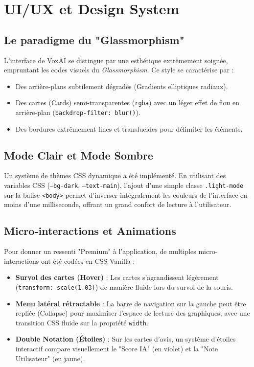 \documentclass[12pt,a4paper]{article}
\begin{document}
\section{UI/UX et Design System}
\subsection{Le paradigme du "Glassmorphism"}
L'interface de VoxAI se distingue par une esthétique extrêmement soignée, empruntant les codes visuels du \textit{Glassmorphism}. Ce style se caractérise par :
\begin{itemize}
    \item Des arrière-plans subtilement dégradés (Gradients elliptiques radiaux).
    \item Des cartes (Cards) semi-transparentes (\texttt{rgba}) avec un léger effet de flou en arrière-plan (\texttt{backdrop-filter: blur()}).
    \item Des bordures extrêmement fines et translucides pour délimiter les éléments.
\end{itemize}

\subsection{Mode Clair et Mode Sombre}
Un système de thèmes CSS dynamique a été implémenté. En utilisant des variables CSS (\texttt{--bg-dark}, \texttt{--text-main}), l'ajout d'une simple classe \texttt{.light-mode} sur la balise \texttt{<body>} permet d'inverser intégralement les couleurs de l'interface en moins d'une milliseconde, offrant un grand confort de lecture à l'utilisateur.

\subsection{Micro-interactions et Animations}
Pour donner un ressenti "Premium" à l'application, de multiples micro-interactions ont été codées en CSS Vanilla :
\begin{itemize}
    \item \textbf{Survol des cartes (Hover)} : Les cartes s'agrandissent légèrement (\texttt{transform: scale(1.03)}) de manière fluide lors du survol de la souris.
    \item \textbf{Menu latéral rétractable} : La barre de navigation sur la gauche peut être repliée (Collapse) pour maximiser l'espace de lecture des graphiques, avec une transition CSS fluide sur la propriété \texttt{width}.
    \item \textbf{Double Notation (Étoiles)} : Sur les cartes d'avis, un système d'étoiles interactif compare visuellement le "Score IA" (en violet) et la "Note Utilisateur" (en jaune).
\end{itemize}
\newpage
\end{document}
